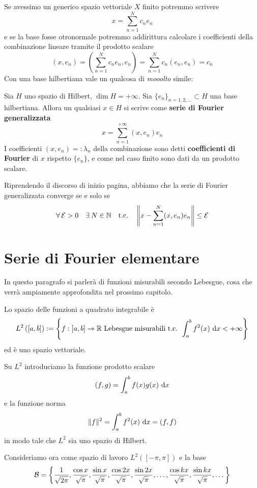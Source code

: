 Se avessimo un generico spazio vettoriale $X$ finito potremmo scrivere
$$
x=\sum_{n=1}^Nc_ne_n
$$
e se la base fosse otronormale potremmo addirittura calcolare i coefficienti della combinazione lineare tramite il prodotto scalare
$$
(x,e_n)=\left(\sum_{n=1}^Nc_ne_n,e_n\right)=\sum_{n=1}^Nc_n(e_n,e_n)=c_n
$$
Con una base hilbertiana vale un qualcosa di \textit{mooolto} simile:
\begin{thm}
\label{teoHNOsepa}
Sia $H$ uno spazio di Hilbert, $\dim H=+\infty$. Sia $\{e_n\}_{n=1,2,\dots}\subset H$ una base hilbertiana. Allora un qualsiasi $x\in H$ si scrive come \textbf{serie di Fourier generalizzata}
\begin{equation*}
\boxed{x = \sum^{+\infty}_{n = 1}(x, e_{n}) e_{n}}
\end{equation*}
I coefficienti $(x,e_n)=:\lambda_n$ della combinazione sono detti \textbf{coefficienti di Fourier} di $x$ rispetto $\{e_n\}$, e come nel caso finito sono dati da un prodotto scalare.
\end{thm}

Riprendendo il discorso di inizio pagina, abbiamo che la serie di Fourier generalizzata converge se e solo se
$$
\forall\Ec>0 \quad \exists N\in \NN \quad \text{t.c.}\quad \left\|x-\sum_{n=1}^N(x,e_n)e_n\right\|\leq \Ec
$$

\newpage

\section{Serie di Fourier elementare}

In questo paragrafo si parlerà di funzioni misurabili secondo Lebesgue, cosa che verrà ampiamente approfondita nel prossimo capitolo.

\begin{defn}
Lo spazio delle funzioni a quadrato integrabile è
$$L^2\left([a,b]\right):=\left\{f:[a,b]\to\mathbb{R}\text{ Lebesgue misurabili t.c. }\displaystyle\int_a^bf^2(x)\  \mathrm{d} x<+\infty \right\}$$
ed è uno spazio vettoriale.
\end{defn}
Su $L^2$ introduciamo la funzione prodotto scalare
\begin{equation*}
(f,g)=\int_a^bf(x)g(x)\  \mathrm{d} x
\end{equation*}
e la funzione norma
\begin{equation*}
\Vert f \Vert ^2=\int_a^bf^2(x)\  \mathrm{d} x=(f,f)
\end{equation*}
in modo tale che $L^2$ sia uno spazio di Hilbert.

Consideriamo ora come spazio di lavoro $L^{2}([ - \pi, \pi])$ e la base
\begin{equation*}
\mathcal{B} = \left\{\frac{1}{\sqrt{2\pi}}, \frac{\cos x}{\sqrt{\pi}}, \frac{\sin x}{\sqrt{\pi}}, \frac{\cos2x}{\sqrt{\pi}}, \frac{\sin2x}{\sqrt{\pi}}, \dotsc, \frac{\cos kx}{\sqrt{\pi}}, \frac{\sin kx}{\sqrt{\pi}}, \dotsc  \right\}
\end{equation*}


